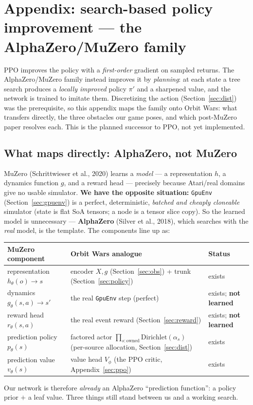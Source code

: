 \documentclass[11pt]{article}
\begin{document}
\section{Appendix: search-based policy improvement --- the AlphaZero/MuZero family}\label{sec:search}
PPO improves the policy with a \emph{first-order} gradient on sampled returns. The AlphaZero/MuZero
family instead improves it by \emph{planning}: at each state a tree search produces a \emph{locally
improved} policy $\pi'$ and a sharpened value, and the network is trained to imitate them. Discretizing
the action (Section~\ref{sec:dist}) was the prerequisite, so this appendix maps the family onto Orbit
Wars: what transfers directly, the three obstacles our game poses, and which post-MuZero paper resolves
each. This is the planned successor to PPO, not yet implemented.

\subsection{What maps directly: AlphaZero, not MuZero}
MuZero (Schrittwieser et al., 2020) learns a \emph{model} --- a representation $h$, a dynamics function
$g$, and a reward head --- precisely because Atari/real domains give no usable simulator. \textbf{We have
the opposite situation:} \texttt{GpuEnv} (Section~\ref{sec:gpuenv}) is a perfect, deterministic,
\emph{batched and cheaply cloneable} simulator (state is flat SoA tensors; a node is a tensor slice
copy). So the learned model is unnecessary --- \textbf{AlphaZero} (Silver et al., 2018), which searches
with the \emph{real} model, is the template. The components line up as:
\begin{center}\small
\begin{tabular}{@{}lll@{}}
\toprule
MuZero component & Orbit Wars analogue & Status \\
\midrule
representation $h_\theta(o)\!\to\! s$ & encoder $X,g$ (Section~\ref{sec:obs}) + trunk (Section~\ref{sec:policy}) & exists \\
dynamics $g_\theta(s,a)\!\to\! s'$ & the real \texttt{GpuEnv} step (perfect) & exists; \textbf{not learned} \\
reward head $r_\theta(s,a)$ & the real event reward (Section~\ref{sec:reward}) & exists; \textbf{not learned} \\
prediction policy $p_\theta(s)$ & factored actor $\prod_{s:\text{owned}}\mathrm{Dirichlet}(\alpha_s)$ (per-source allocation, Section~\ref{sec:dist}) & exists \\
prediction value $v_\theta(s)$ & value head $V_\phi$ (the PPO critic, Appendix~\ref{sec:ppo}) & exists \\
\bottomrule
\end{tabular}
\end{center}
Our network is therefore \emph{already} an AlphaZero ``prediction function'': a policy prior $+$ a leaf
value. Three things still stand between us and a working search.
\end{document}
